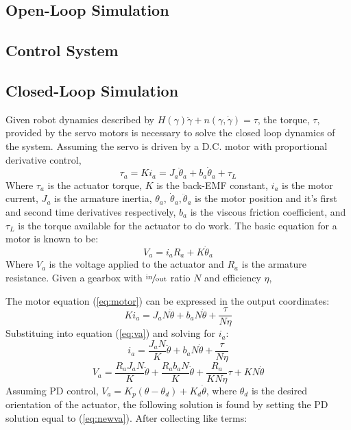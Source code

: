\documentclass[12pt]{report}
\begin{document}
\subsection{Open-Loop Simulation}
\subsection{Control System}
\newpage
\subsection{Closed-Loop Simulation}
Given robot dynamics described by \(H(\gamma)\ddot{\gamma} + n(\gamma,\dot{\gamma}) = \tau\), the torque, $\tau$, provided by the servo motors is necessary to solve the closed loop dynamics of the system. Assuming the servo is driven by a D.C. motor with proportional derivative control,
\begin{equation}
  \tau_a = Ki_a = J_a\ddot{\theta}_a + b_a\dot{\theta}_a + \tau_L
  \label{eq:motor}
\end{equation}
Where $\tau_a$ is the actuator torque, $K$ is the back-EMF constant, $i_a$ is the motor current, $J_a$ is the armature inertia, $\theta_a,~\dot{\theta}_a,\ddot{\theta}_a$ is the motor position and it's first and second time derivatives respectively, $b_a$ is the viscous friction coefficient, and $\tau_L$ is the torque available for the actuator to do work. The basic equation for a motor is known to be:
\begin{equation}
  V_a = i_aR_a + K\dot{\theta}_a
  \label{eq:va}
\end{equation}
Where $V_a$ is the voltage applied to the actuator and $R_a$ is the armature resistance. Given a gearbox with $\sfrac{\text{in}}{\text{out}}$ ratio $N$ and efficiency $\eta$,

The motor equation (\ref{eq:motor}) can be expressed in the output coordinates:
\[
Ki_a = J_aN\ddot{\theta} + b_aN\dot{\theta} + \frac{\tau}{N\eta}
\]
Substituing into equation (\ref{eq:va}) and solving for $i_a$:
\[
  i_a = \frac{J_aN}{K}\ddot{\theta} + b_aN\dot{\theta} + \frac{\tau}{N\eta}
\]
\begin{equation}
  V_a = \frac{R_aJ_aN}{K}\ddot{\theta} + \frac{R_ab_aN}{K}\dot{\theta} + \frac{R_a}{KN\eta}\tau + KN\dot{\theta}
  \label{eq:newva}
\end{equation}
Assuming PD control, \(V_a = K_p(\theta-\theta_d) + K_d\dot{\theta}\), where $\theta_d$ is the desired orientation of the actuator, the following solution is found by setting the PD solution equal to (\ref{eq:newva}). After collecting like terms:
\end{document}
